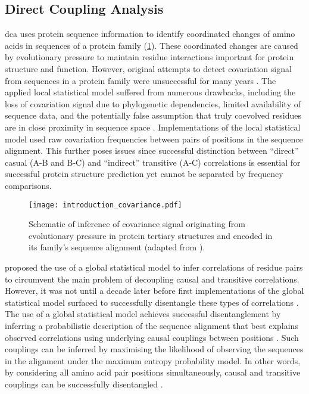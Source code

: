 \subsection{Direct Coupling Analysis}
\Acrlong{dca} uses protein sequence information to identify coordinated changes of amino acids in sequences of a protein family (\cref{fig:introduction_covariance}). These coordinated changes are caused by evolutionary pressure to maintain residue interactions important for protein structure and function. However, original attempts to detect covariation signal from sequences in a protein family were unsuccessful for many years \cite{Taylor1994-es,Gobel1994-rp,Neher1994-qn,Shindyalov1994-yp}. The applied local statistical model suffered from numerous drawbacks, including the loss of covariation signal due to phylogenetic dependencies, limited availability of sequence data, and the potentially false assumption that truly coevolved residues are in close proximity in sequence space \cite{Pollock1997-os,Lapedes1999-cg,Lapedes2012-tu}. Implementations of the local statistical model used raw covariation frequencies between pairs of positions in the sequence alignment. This further poses issues since successful distinction between ``direct'' casual (A-B and B-C) and ``indirect'' transitive (A-C) correlations is essential for successful protein structure prediction yet cannot be separated by frequency comparisons. 

\begin{figure}[H]
    \centering
    \texttt{[image: introduction\_covariance.pdf]}
    \caption[Schematic of inference of covariance signal]{Schematic of inference of covariance signal originating from evolutionary pressure in protein tertiary structures and encoded in its family's sequence alignment (adapted from \cite{Simkovic2017-xs}).}
    \label{fig:introduction_covariance}
\end{figure}

\textcite{Lapedes1999-cg} proposed the use of a global statistical model to infer correlations of residue pairs to circumvent the main problem of decoupling causal and transitive correlations. However, it was not until a decade later before first implementations of the global statistical model surfaced to successfully disentangle these types of correlations \cite{Weigt2009-sx,Burger2010-ee,Balakrishnan2011-wh,Marks2011-os,Morcos2011-lk,Jones2012-ks,Ekeberg2013-ay,Kamisetty2013-le,Seemayer2014-zp}. The use of a global statistical model achieves successful disentanglement by inferring a probabilistic description of the sequence alignment that best explains observed correlations using underlying causal couplings between positions \cite{Hopf2017-pp}. Such couplings can be inferred by maximising the likelihood of observing the sequences in the alignment under the maximum entropy probability model. In other words, by considering all amino acid pair positions simultaneously, causal and transitive couplings can be successfully disentangled \cite{Ekeberg2013-ay}.

